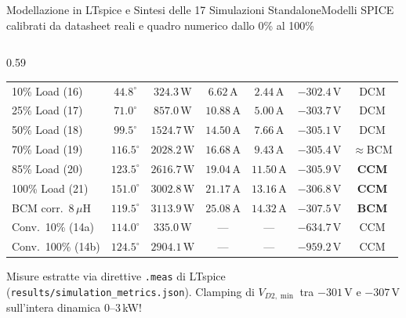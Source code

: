 \documentclass[aspectratio=169,9pt]{beamer}
\newcommand{\V}{\,\text{V}}
\newcommand{\A}{\,\text{A}}
\newcommand{\W}{\,\text{W}}
\newcommand{\uH}{\,\mu\text{H}}
\begin{document}
\begin{frame}{Modellazione in LTspice e Sintesi delle 17 Simulazioni Standalone}{Modelli SPICE calibrati da datasheet reali e quadro numerico dallo 0\% al 100\%}
\begin{columns}[T,onlytextwidth]
\begin{column}{0.59\textwidth}
\begin{tabular}{@{}lcccccc@{}}
        10\% Load (16)   & $44.8^\circ$ & $324.3\W$ & $6.62\A$ & $2.44\A$ & $-302.4\V$ & DCM \\
        25\% Load (17)   & $71.0^\circ$ & $857.0\W$ & $10.88\A$ & $5.00\A$ & $-303.7\V$ & DCM \\
        50\% Load (18)   & $99.5^\circ$ & $1524.7\W$ & $14.50\A$ & $7.66\A$ & $-305.1\V$ & DCM \\
        70\% Load (19)   & $116.5^\circ$ & $2028.2\W$ & $16.68\A$ & $9.43\A$ & $-305.4\V$ & $\approx$BCM \\
        85\% Load (20)   & $123.5^\circ$ & $2616.7\W$ & $19.04\A$ & $11.50\A$ & $-305.9\V$ & \color{WarnAmber}\textbf{CCM} \\
        100\% Load (21)  & $151.0^\circ$ & $3002.8\W$ & $21.17\A$ & $13.16\A$ & $-306.8\V$ & \color{AlertRed}\textbf{CCM} \\
        \midrule
        BCM corr.\ $8\uH$ & $119.5^\circ$ & $3113.9\W$ & $25.08\A$ & $14.32\A$ & $-307.5\V$ & \color{GoodGreen}\textbf{BCM} \\
        Conv.\ 10\% (14a) & $114.0^\circ$ & $335.0\W$ & --- & --- & \color{AlertRed}\textbf{$-634.7\V$} & CCM \\
        Conv.\ 100\% (14b)& $124.5^\circ$ & $2904.1\W$ & --- & --- & \color{AlertRed}\textbf{$-959.2\V$} & CCM \\
        \bottomrule
      \end{tabular}

      \vspace*{1.5mm}
      {\tiny\color{MutedGray}Misure estratte via direttive \texttt{.meas} di LTspice (\texttt{results/simulation\_metrics.json}). Clamping di $V_{D2,\min}$ tra $-301\V$ e $-307\V$ sull'intera dinamica 0--3\,kW!}
    \end{column}
  \end{columns}
\end{frame}
\end{document}

